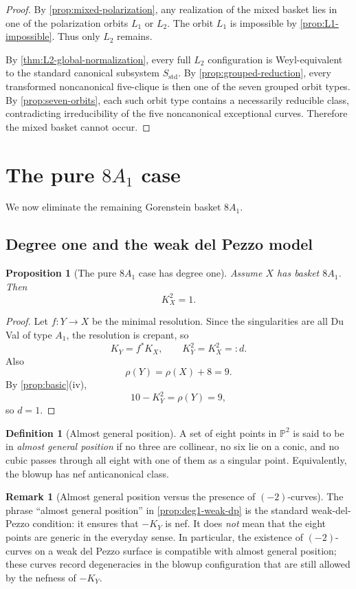 \documentclass[11pt]{article}
\newtheorem{proposition}[proposition]{Proposition}
\theoremstyle{definition}
\newtheorem{remark}[remark]{Remark}
\newtheorem{definition}[definition]{Definition}
\newcommand{\Pbb}{\mathbb P}
\begin{document}
\begin{proof}
By \cref{prop:mixed-polarization}, any realization of the mixed basket lies in one of the polarization orbits $L_1$ or $L_2$. The orbit $L_1$ is impossible by \cref{prop:L1-impossible}. Thus only $L_2$ remains.

By \cref{thm:L2-global-normalization}, every full $L_2$ configuration is Weyl-equivalent to the standard canonical subsystem $S_{\mathrm{std}}$. By \cref{prop:grouped-reduction}, every transformed noncanonical five-clique is then one of the seven grouped orbit types. By \cref{prop:seven-orbits}, each such orbit type contains a necessarily reducible class, contradicting irreducibility of the five noncanonical exceptional curves. Therefore the mixed basket cannot occur.
\end{proof}

\section{The pure $8A_1$ case}\label{sec:pure8a1}
We now eliminate the remaining Gorenstein basket $8A_1$.

\subsection{Degree one and the weak del Pezzo model}

\begin{proposition}[The pure $8A_1$ case has degree one]\label{prop:8a1-degree-one}
Assume $X$ has basket $8A_1$. Then
\[
K_X^2=1.
\]
\end{proposition}

\begin{proof}
Let $f\colon Y\to X$ be the minimal resolution. Since the singularities are all Du Val of type $A_1$, the resolution is crepant, so
\[
K_Y=f^*K_X,
\qquad
K_Y^2=K_X^2=:d.
\]
Also
\[
\rho(Y)=\rho(X)+8=9.
\]
By \cref{prop:basic}(iv),
\[
10-K_Y^2=\rho(Y)=9,
\]
so $d=1$.
\end{proof}

\begin{definition}[Almost general position]
A set of eight points in $\Pbb^2$ is said to be in \emph{almost general position} if no three are collinear, no six lie on a conic, and no cubic passes through all eight with one of them as a singular point. Equivalently, the blowup has nef anticanonical class.
\end{definition}

\begin{remark}[Almost general position versus the presence of $(-2)$-curves]
The phrase ``almost general position'' in \cref{prop:deg1-weak-dp} is the standard weak-del-Pezzo condition: it ensures that $-K_Y$ is nef. It does \emph{not} mean that the eight points are generic in the everyday sense. In particular, the existence of $(-2)$-curves on a weak del Pezzo surface is compatible with almost general position; these curves record degeneracies in the blowup configuration that are still allowed by the nefness of $-K_Y$.
\end{remark}
\end{document}
